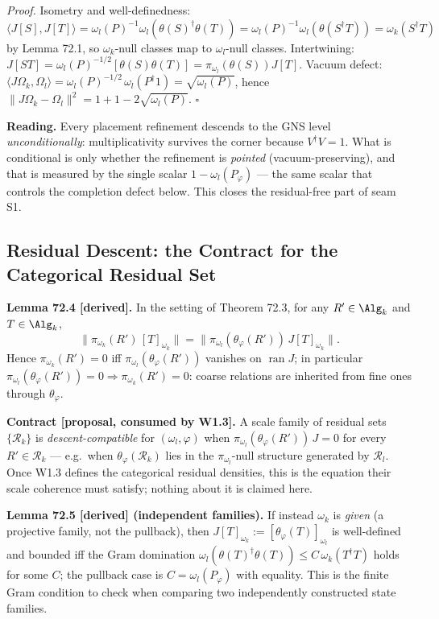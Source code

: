 \emph{Proof.}  Isometry and well-definedness:
\(\langle J[S],J[T]\rangle
=\omega_l(P)^{-1}\omega_l(\theta(S)^\dagger\theta(T))
=\omega_l(P)^{-1}\omega_l(\theta(S^\dagger T))=\omega_k(S^\dagger T)\)
by Lemma 72.1, so \(\omega_k\)-null classes map to
\(\omega_l\)-null classes.  Intertwining:
\(J[ST]=\omega_l(P)^{-1/2}[\theta(S)\theta(T)]
=\pi_{\omega_l}(\theta(S))J[T]\).  Vacuum defect:
\(\langle J\Omega_k,\Omega_l\rangle
=\omega_l(P)^{-1/2}\,\omega_l(P^\dagger 1)=\sqrt{\omega_l(P)}\), hence
\(\|J\Omega_k-\Omega_l\|^2=1+1-2\sqrt{\omega_l(P)}\). \(\square\)

\textbf{Reading.}  Every placement refinement descends to the GNS level
\emph{unconditionally}: multiplicativity survives the corner because
\(V^\dagger V=1\).  What is conditional is only whether the refinement is
\emph{pointed} (vacuum-preserving), and that is measured by the single
scalar \(1-\omega_l(P_\varphi)\) --- the same scalar that controls the
completion defect below.  This closes the residual-free part of seam S1.

\subsection{Residual Descent: the Contract for the Categorical Residual Set}

\textbf{Lemma 72.4 [derived].}  In the setting of Theorem 72.3, for any
\(R'\in\Alg_k\) and \(T\in\Alg_k\),
\[
  \bigl\|\pi_{\omega_k}(R')\,[T]_{\omega_k}\bigr\|
  =\bigl\|\pi_{\omega_l}(\theta_\varphi(R'))\,J[T]_{\omega_k}\bigr\| .
\]
Hence \(\pi_{\omega_k}(R')=0\) iff \(\pi_{\omega_l}(\theta_\varphi(R'))\)
vanishes on \(\operatorname{ran}J\); in particular
\(\pi_{\omega_l}(\theta_\varphi(R'))=0\Rightarrow\pi_{\omega_k}(R')=0\):
coarse relations are inherited from fine ones through \(\theta_\varphi\).

\textbf{Contract [proposal, consumed by W1.3].}  A scale family of residual
sets \(\{\mathcal R_k\}\) is \emph{descent-compatible} for
\((\omega_l,\varphi)\) when
\(\pi_{\omega_l}(\theta_\varphi(R'))\,J=0\) for every
\(R'\in\mathcal R_k\) --- e.g.\ when \(\theta_\varphi(\mathcal R_k)\) lies
in the \(\pi_{\omega_l}\)-null structure generated by \(\mathcal R_l\).
Once W1.3 defines the categorical residual densities, this is the equation
their scale coherence must satisfy; nothing about it is claimed here.

\textbf{Lemma 72.5 [derived] (independent families).}  If instead
\(\omega_k\) is \emph{given} (a projective family, not the pullback), then
\(J[T]_{\omega_k}:=[\theta_\varphi(T)]_{\omega_l}\) is well-defined and
bounded iff the Gram domination
\(\omega_l(\theta(T)^\dagger\theta(T))\le C\,\omega_k(T^\dagger T)\) holds
for some \(C\); the pullback case is \(C=\omega_l(P_\varphi)\) with
equality.  This is the finite Gram condition to check when comparing two
independently constructed state families.

